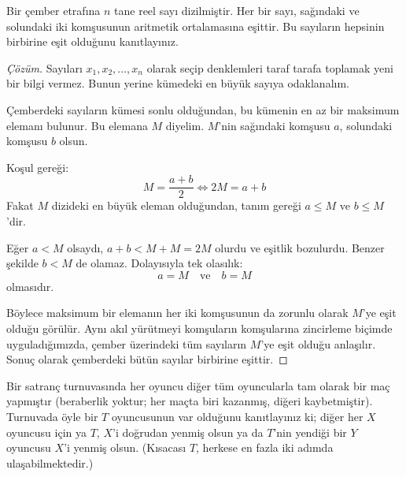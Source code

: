 \begin{example}
Bir çember etrafına $n$ tane reel sayı dizilmiştir. Her bir sayı, sağındaki ve solundaki iki komşusunun aritmetik ortalamasına eşittir. Bu sayıların hepsinin birbirine eşit olduğunu kanıtlayınız.
\end{example}

\begin{proof}[Çözüm]
Sayıları $x_1, x_2, \dots, x_n$ olarak seçip denklemleri taraf tarafa toplamak yeni bir bilgi vermez. Bunun yerine kümedeki en büyük sayıya odaklanalım.

Çemberdeki sayıların kümesi sonlu olduğundan, bu kümenin en az bir maksimum elemanı bulunur. Bu elemana $M$ diyelim. $M$'nin sağındaki komşusu $a$, solundaki komşusu $b$ olsun.

Koşul gereği:
\[
M = \frac{a + b}{2} \iff 2M = a + b
\]
Fakat $M$ dizideki en büyük eleman olduğundan, tanım gereği $a \le M$ ve $b \le M$'dir. 

Eğer $a < M$ olsaydı, $a + b < M + M = 2M$ olurdu ve eşitlik bozulurdu. Benzer şekilde $b < M$ de olamaz. Dolayısıyla tek olasılık:
\[
a = M \quad \text{ve} \quad b = M
\]
olmasıdır.

Böylece maksimum bir elemanın her iki komşusunun da zorunlu olarak $M$'ye eşit olduğu görülür. Aynı akıl yürütmeyi komşuların komşularına zincirleme biçimde uyguladığımızda, çember üzerindeki tüm sayıların $M$'ye eşit olduğu anlaşılır. Sonuç olarak çemberdeki bütün sayılar birbirine eşittir.
\end{proof}

\begin{example}
Bir satranç turnuvasında her oyuncu diğer tüm oyuncularla tam olarak bir maç yapmıştır (beraberlik yoktur; her maçta biri kazanmış, diğeri kaybetmiştir). Turnuvada öyle bir $T$ oyuncusunun var olduğunu kanıtlayınız ki; diğer her $X$ oyuncusu için ya $T$, $X$'i doğrudan yenmiş olsun ya da $T$'nin yendiği bir $Y$ oyuncusu $X$'i yenmiş olsun. (Kısacası $T$, herkese en fazla iki adımda ulaşabilmektedir.)
\end{example}

